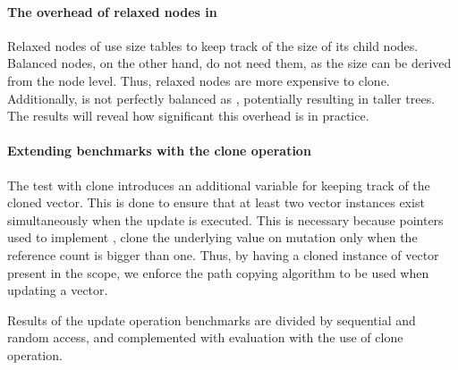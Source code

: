 \paragraph{The overhead of relaxed nodes in \rrbtree{}}
Relaxed nodes of \rrbtree{} use size tables to keep track of the size of its child nodes. Balanced nodes, on the other hand, do not need them, as the size can be derived from the node level. Thus, relaxed nodes are more expensive to clone. Additionally, \rrbtree{} is not perfectly balanced as \rbtree{}, potentially resulting in taller trees. The results will reveal how significant this overhead is in practice.

\paragraph{Extending benchmarks with the clone operation}
The test with clone introduces an additional variable for keeping track of the cloned vector. This is done to ensure that at least two vector instances exist simultaneously when the update is executed. This is necessary because \rc{} pointers used to implement \rbtree{}, clone the underlying value on mutation only when the reference count is bigger than one. Thus, by having a cloned instance of vector present in the scope, we enforce the path copying algorithm to be used when updating a vector.

Results of the update operation benchmarks are divided by sequential and random access, and complemented with evaluation with the use of clone operation.

